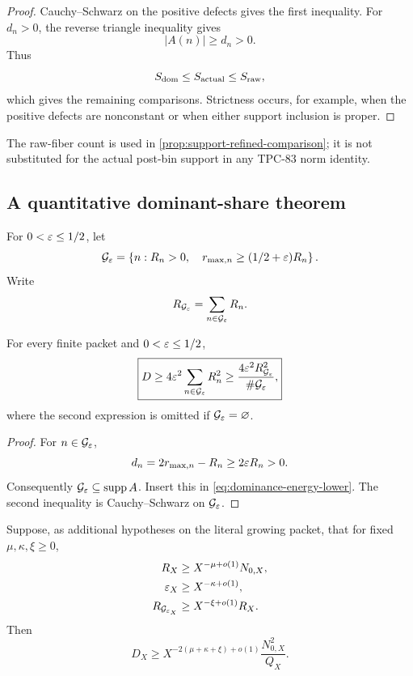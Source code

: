 \begin{proof}
Cauchy--Schwarz on the positive defects gives the first inequality.
For \(d_n>0\), the reverse triangle inequality gives
\[
 |A(n)|\ge d_n>0.
\]
Thus
\[
 S_{\mathrm{dom}}\le S_{\rm actual}\le S_{\rm raw},
\]
which gives the remaining comparisons.  Strictness occurs, for
example, when the positive defects are nonconstant or when either
support inclusion is proper.
\end{proof}

The raw-fiber count is used in
\cref{prop:support-refined-comparison}; it is not substituted for the
actual post-bin support in any TPC-83 norm identity.

\subsection{A quantitative dominant-share theorem}

\begin{definition}
\label{def:dominant-fibers}
For \(0<\varepsilon\le1/2\), let
\[
 \mathcal G_\varepsilon
 =
 \left\{
 n:R_n>0,\quad r_{\max,n}\ge(1/2+\varepsilon)R_n
 \right\}.
\]
Write
\[
 R_{\mathcal G_\varepsilon}=\sum_{n\in\mathcal G_\varepsilon}R_n.
\]
\end{definition}

\begin{theorem}
\label{thm:dominant-share}
For every finite packet and \(0<\varepsilon\le1/2\),
\begin{equation}
 \boxed{
 D
 \ge4\varepsilon^2\sum_{n\in\mathcal G_\varepsilon}R_n^2
 \ge
 \frac{4\varepsilon^2R_{\mathcal G_\varepsilon}^2}
 {\#\mathcal G_\varepsilon},}
\label{eq:dominant-share-bound}
\end{equation}
where the second expression is omitted if
\(\mathcal G_\varepsilon=\varnothing\).
\end{theorem}

\begin{proof}
For \(n\in\mathcal G_\varepsilon\),
\[
 d_n=2r_{\max,n}-R_n\ge2\varepsilon R_n>0.
\]
Consequently \(\mathcal G_\varepsilon\subseteq\operatorname{supp} A\).
Insert this in \eqref{eq:dominance-energy-lower}.  The second
inequality is Cauchy--Schwarz on \(\mathcal G_\varepsilon\).
\end{proof}

\medskip
\begin{corollary}
\label{cor:dominant-exponent}
Suppose, as additional hypotheses on the literal growing packet, that
for fixed \(\mu,\kappa,\xi\ge0\),
\begin{align}
 R_X&\ge X^{-\mu+o(1)}N_{0,X},
\label{eq:raw-lower-hyp}\\
 \varepsilon_X&\ge X^{-\kappa+o(1)},
\label{eq:dominance-margin-hyp}\\
 R_{\mathcal G_{\varepsilon_X}}
 &\ge X^{-\xi+o(1)}R_X.
\label{eq:dominant-share-hyp}
\end{align}
Then
\begin{equation}
 \boxed{
 D_X
 \ge
 X^{-2(\mu+\kappa+\xi)+o(1)}
 \frac{N_{0,X}^2}{Q_X}.}
\label{eq:dominant-exponent-output}
\end{equation}
\end{corollary}

